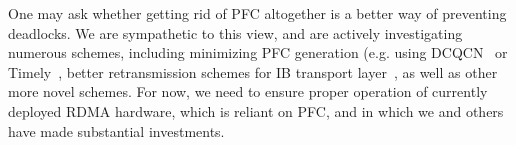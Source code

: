  One may ask whether getting rid of PFC altogether is a
better way of preventing deadlocks.  We are sympathetic to this view, and are
actively investigating numerous schemes, including minimizing PFC generation
(e.g.  using DCQCN~\cite{dcqcn} or Timely~\cite{timely}, better retransmission
schemes for IB transport layer~\cite{roce}, as well as other more novel schemes.
For now, we need \sysname{} to ensure proper operation of currently deployed RDMA
hardware, which is reliant on PFC, and in which we and others have made
substantial investments.

